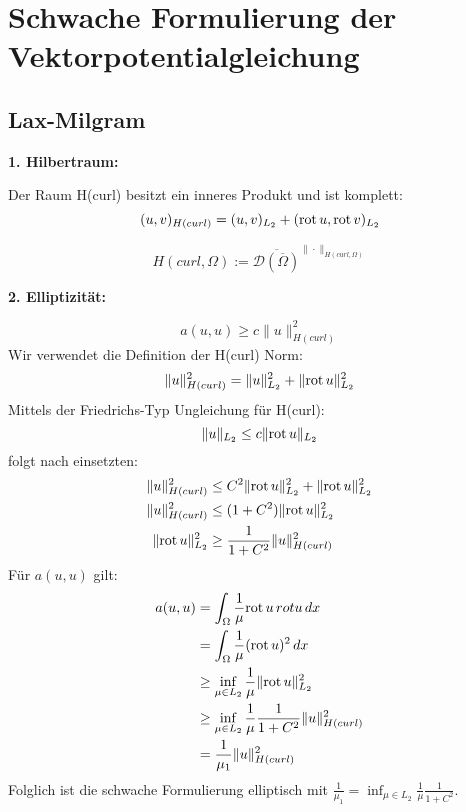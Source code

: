 \section{Schwache Formulierung der Vektorpotentialgleichung}

\subsection{Lax-Milgram}
\textbf{1. Hilbertraum:}\par
Der Raum H(curl) besitzt ein inneres Produkt und ist komplett:
\begin{equation}
	(u,v)_{H(curl)} = (u,v)_{L_2} + (\mathrm{rot}\, u,\mathrm{rot}\, v)_{L_2} 
\end{equation}

\begin{equation}
	H(curl,\Omega) := \overline{\mathcal{D}(\overline{\Omega})}^{\| \cdot \|_{H(curl,\Omega)}}
\end{equation}

\textbf{2. Elliptizit\"at:}\par
\begin{equation}
	a(u,u) \geq c\|u\|^2_{H(curl)}
\end{equation}
Wir verwendet die Definition der H(curl) Norm:
\begin{equation}
	\|u\|^2_{H(curl)} = \|u\|^2_{L_2} + \|\mathrm{rot}\, u\|^2_{L_2}
\end{equation}
Mittels der Friedrichs-Typ Ungleichung f\"ur H(curl):
\begin{equation}
	\|u\|_{L_2} \leq c\|\mathrm{rot}\, u\|_{L_2}
\end{equation}
folgt nach einsetzten:
\begin{align}
	\|u\|^2_{H(curl)} &\leq C^2\|\mathrm{rot}\, u\|^2_{L_2} + \|\mathrm{rot}\, u\|^2_{L_2} \\
	\|u\|^2_{H(curl)} &\leq (1+C^2)\|\mathrm{rot}\, u\|^2_{L_2} \\
	\|\mathrm{rot}\, u\|^2_{L_2} &\geq \frac{1}{1+C^2}\|u\|^2_{H(curl)}\\
\end{align}
F\"ur $a(u,u)$ gilt:
\begin{align}
	a(u,u) &= \int_\Omega \frac{1}{\mu} \mathrm{rot}\, u\,rot u \,dx \\
	 &= \int_\Omega \frac{1}{\mu} (\mathrm{rot}\, u)^2\,dx \\
	 &\geq \inf_{\mu \in L_2} \frac{1}{\mu}\|\mathrm{rot}\, u\|^2_{L_2} \\
	 &\geq \inf_{\mu \in L_2} \frac{1}{\mu}\frac{1}{1+C^2}\|u\|^2_{H(curl)}\\
	 &= \frac{1}{\mu_1}\|u\|^2_{H(curl)}
\end{align}
Folglich ist die schwache Formulierung elliptisch mit $\frac{1}{\mu_1} = \inf_{\mu \in L_2}\frac{1}{\mu}\frac{1}{1+C^2}$.



